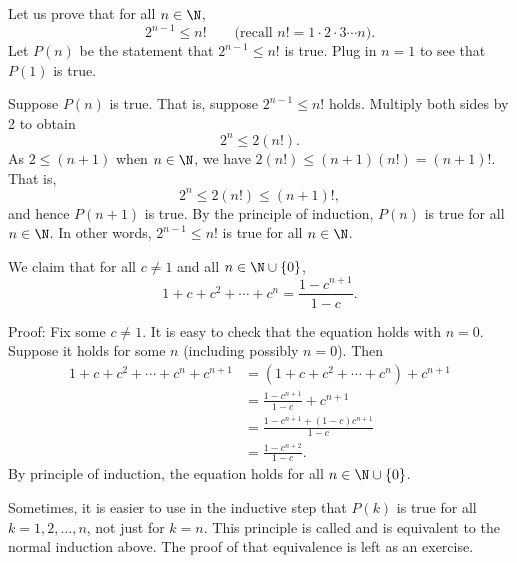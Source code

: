 \begin{example}
Let us prove that for all $n \in \N$,
\begin{equation*}
2^{n-1} \leq n! \qquad \text{(recall } n! = 1 \cdot 2 \cdot 3 \cdots n\text{)}.
\end{equation*}
Let $P(n)$ be the statement that
$2^{n-1} \leq n!$ is true.
Plug in $n=1$ to see that $P(1)$ is true.

Suppose $P(n)$ is true.  That is, suppose 
$2^{n-1} \leq n!$ holds.  Multiply both sides by 2 to obtain
\begin{equation*}
2^n \leq 2(n!) .
\end{equation*}
As $2 \leq (n+1)$ when $n \in \N$, we have
$2(n!) \leq (n+1)(n!) = (n+1)!$.  That is,
\begin{equation*}
2^n \leq 2(n!) \leq  (n+1)!,
\end{equation*}
and hence $P(n+1)$ is true.  By the principle of induction,
$P(n)$
is true for all $n \in \N$.  In other words,
$2^{n-1} \leq n!$ is true for all $n \in \N$.
\end{example}

\begin{example} \label{example:geometricsum}
We claim that for all $c \not= 1$
and all $n \in \N \cup \{ 0 \}$,
\begin{equation*}
1 + c + c^2 + \cdots + c^n = \frac{1-c^{n+1}}{1-c} .
\end{equation*}

Proof: Fix some $c \not= 1$.
It is easy to check that the equation holds with $n=0$.
Suppose it holds for some $n$ (including possibly $n=0$).
Then
\begin{equation*}
\begin{split}
1 + c + c^2 + \cdots + c^n + c^{n+1} & =
( 1 + c + c^2 + \cdots + c^n ) + c^{n+1} \\
& = \frac{1-c^{n+1}}{1-c}  + c^{n+1} \\
& = \frac{1-c^{n+1}  + (1-c)c^{n+1}}{1-c} \\
& = \frac{1-c^{n+2}}{1-c} .
\end{split}
\end{equation*}
By principle of induction, the equation holds for all
$n \in \N \cup \{ 0 \}$.
\end{example}

Sometimes, it is easier to use in the inductive step
that $P(k)$ is true for all $k = 1,2,\ldots,n$, not just for $k=n$.
This principle is called \emph{} and is equivalent
to the normal induction above.  The proof of that
equivalence is left as an exercise.

